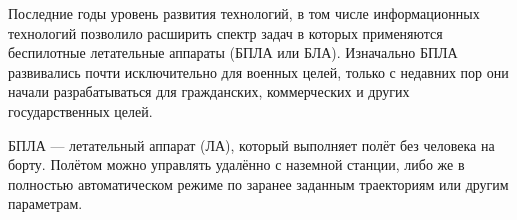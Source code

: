 \documentclass[specification,annotation]{itmo-student-thesis}
\begin{document}


\researchsummary{<++>}




\tableofcontents

\startprefacepage

Последние годы уровень развития технологий, в том числе информационных
технологий позволило расширить спектр задач в которых применяются беспилотные
летательные аппараты (БПЛА или БЛА). Изначально БПЛА развивались почти
исключительно для военных целей, только с недавних пор они начали
разрабатываться для гражданских, коммерческих и других государственных целей.

БПЛА --- летательный аппарат (ЛА), который выполняет полёт без человека на борту.
Полётом можно управлять удалённо с наземной станции, либо же в полностью
автоматическом режиме по заранее заданным траекториям или другим
параметрам.\cite{austin-uas}
\end{document}
